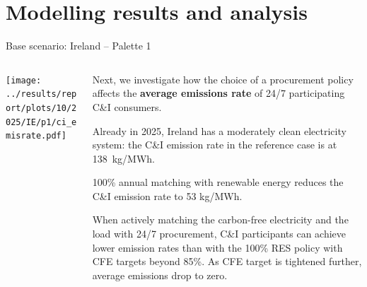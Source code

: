 \section{Modelling results and analysis}



\begin{frame}{Base scenario: Ireland -- Palette 1}

{\footnotesize
\vspace{0.3cm}

\begin{columns}[T]
\begin{column}{9cm}
\centering

\texttt{[image: ../results/report/plots/10/2025/IE/p1/ci\_emisrate.pdf]}

\end{column}
\begin{column}{6cm}

\vspace{0.1cm}
Next, we investigate how the choice of a procurement policy affects the {\bf average emissions 
rate} of 24/7 participating C\&I consumers.

\vspace{0.3cm}
Already in 2025, Ireland has a moderately clean electricity system: 
the C\&I emission rate in the reference case is at 138~kg/MWh.

\vspace{0.3cm}
100\% annual matching with renewable energy reduces the 
C\&I emission rate to 53 kg/MWh.

\vspace{0.3cm}
When actively matching the carbon-free electricity and the load with 
24/7 procurement, C\&I participants can achieve \alert{lower emission 
rates than with the 100\% RES policy} with CFE targets beyond 85\%. 
As CFE target is tightened further, average emissions \alert{drop to zero}.

\end{column}
\end{columns}
}
\end{frame}




